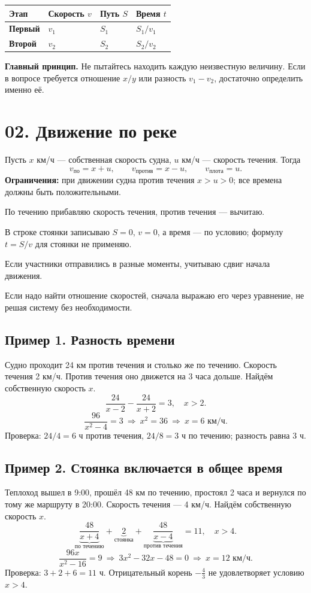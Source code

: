 \documentclass[a4paper,12pt]{article}
\newcommand{\key}[1]{\textcolor{darkaccent}{\bfseries #1}}
\newcommand{\ruleline}{\par\vspace{.15em}{\color{accent!65}\hrule height .6pt}\vspace{.65em}}
\newcommand{\checks}[1]{\item[$\square$] #1}
\begin{document}
\begin{center}
\renewcommand{\arraystretch}{1.35}
\begin{tabularx}{\linewidth}{>{\bfseries}lXXX}
\toprule
Этап & Скорость $v$ & Путь $S$ & Время $t$\\
\midrule
Первый & $v_1$ & $S_1$ & $S_1/v_1$\\
Второй & $v_2$ & $S_2$ & $S_2/v_2$\\
\bottomrule
\end{tabularx}
\end{center}

\key{Главный принцип.} Не пытайтесь находить каждую неизвестную величину. Если в вопросе требуется отношение $x/y$ или разность $v_1-v_2$, достаточно определить именно её.

\section*{02. Движение по реке}
\ruleline
Пусть $x$ км/ч --- собственная скорость судна, $u$ км/ч --- скорость течения. Тогда
\[
 v_{\text{по}}=x+u,\qquad v_{\text{против}}=x-u,\qquad
 v_{\text{плота}}=u.
\]
\key{Ограничения:} при движении судна против течения $x>u>0$; все времена должны быть положительными.

\begin{checklist}
\checks{По течению прибавляю скорость течения, против течения --- вычитаю.}
\checks{В строке стоянки записываю $S=0$, $v=0$, а время --- по условию; формулу $t=S/v$ для стоянки не применяю.}
\checks{Если участники отправились в разные моменты, учитываю сдвиг начала движения.}
\checks{Если надо найти отношение скоростей, сначала выражаю его через уравнение, не решая систему без необходимости.}
\end{checklist}

\subsection*{Пример 1. Разность времени}
Судно проходит 24 км против течения и столько же по течению. Скорость течения 2 км/ч. Против течения оно движется на 3 часа дольше. Найдём собственную скорость $x$.
\[
 \frac{24}{x-2}-\frac{24}{x+2}=3,\quad x>2.
\]
\[
 \frac{96}{x^2-4}=3\ \Longrightarrow\ x^2=36
 \ \Longrightarrow\ \boxed{x=6\text{ км/ч}}.
\]
Проверка: $24/4=6$ ч против течения, $24/8=3$ ч по течению; разность равна 3 ч.

\subsection*{Пример 2. Стоянка включается в общее время}
Теплоход вышел в 9:00, прошёл 48 км по течению, простоял 2 часа и вернулся по тому же маршруту в 20:00. Скорость течения --- 4 км/ч. Найдём собственную скорость $x$.
\[
 \underbrace{\frac{48}{x+4}}_{\text{по течению}}+
 \underbrace{2}_{\text{стоянка}}+
 \underbrace{\frac{48}{x-4}}_{\text{против течения}}
 =11,\quad x>4.
\]
\[
 \frac{96x}{x^2-16}=9\ \Longrightarrow\
 3x^2-32x-48=0\ \Longrightarrow\ \boxed{x=12\text{ км/ч}}.
\]
Проверка: $3+2+6=11$ ч. Отрицательный корень $-\tfrac43$ не удовлетворяет условию $x>4$.
\end{document}
